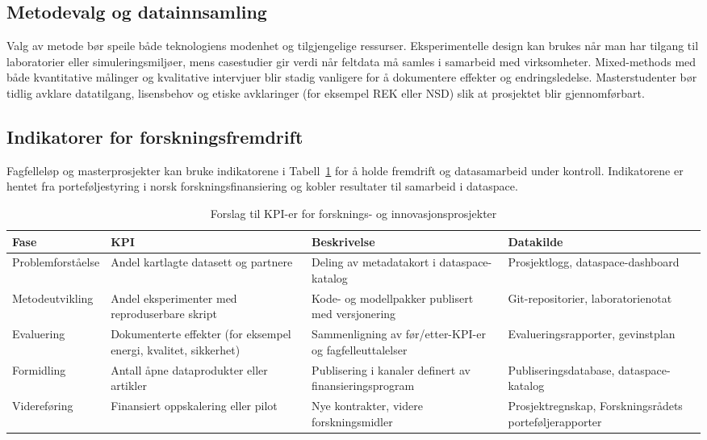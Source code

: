 \subsection{Metodevalg og datainnsamling}
Valg av metode bør speile både teknologiens modenhet og tilgjengelige ressurser. Eksperimentelle design kan brukes når man har tilgang til laboratorier eller simuleringsmiljøer, mens casestudier gir verdi når feltdata må samles i samarbeid med virksomheter. Mixed-methods med både kvantitative målinger og kvalitative intervjuer blir stadig vanligere for å dokumentere effekter og endringsledelse. Masterstudenter bør tidlig avklare datatilgang, lisensbehov og etiske avklaringer (for eksempel REK eller NSD) slik at prosjektet blir gjennomførbart.

\subsection*{Indikatorer for forskningsfremdrift}
Fagfelleløp og masterprosjekter kan bruke indikatorene i Tabell~\ref{tab:forskningsindikatorer} for å holde fremdrift og datasamarbeid under kontroll. Indikatorene er hentet fra porteføljestyring i norsk forskningsfinansiering og kobler resultater til samarbeid i dataspace.

\begin{table}[h]
    \centering
    \caption{Forslag til KPI-er for forsknings- og innovasjonsprosjekter}
    \label{tab:forskningsindikatorer}
    \begin{tabular}{p{2.6cm}p{3.8cm}p{3.8cm}p{3.2cm}}
        \toprule
        Fase & KPI & Beskrivelse & Datakilde \\
        \midrule
        Problemforståelse & Andel kartlagte datasett og partnere & Deling av metadatakort i dataspace-katalog & Prosjektlogg, dataspace-dashboard \\
        Metodeutvikling & Andel eksperimenter med reproduserbare skript & Kode- og modellpakker publisert med versjonering & Git-repositorier, laboratorienotat \\
        Evaluering & Dokumenterte effekter (for eksempel energi, kvalitet, sikkerhet) & Sammenligning av før/etter-KPI-er og fagfelleuttalelser & Evalueringsrapporter, gevinstplan \\
        Formidling & Antall åpne dataprodukter eller artikler & Publisering i kanaler definert av finansieringsprogram & Publiseringsdatabase, dataspace-katalog \\
        Videreføring & Finansiert oppskalering eller pilot & Nye kontrakter, videre forskningsmidler & Prosjektregnskap, Forskningsrådets porteføljerapporter \\
        \bottomrule
    \end{tabular}
\end{table}

